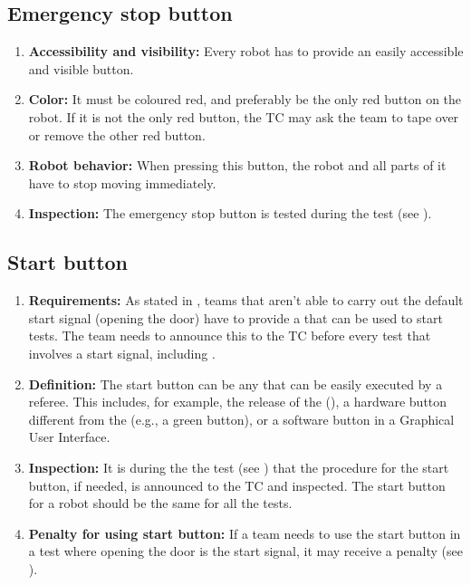 \subsection{Emergency stop button}
\label{rule:robots_emergency_button}

\begin{enumerate}
	\item \textbf{Accessibility and visibility:} Every robot has to provide an easily accessible and visible  button. 
	\item \textbf{Color:} It must be coloured red, and preferably be the only red button on the robot. If it is not the only red button, the TC may ask the team to tape over or remove the other red button. 
	\item \textbf{Robot behavior:} When pressing this button, the robot and all parts of it have to stop moving immediately.
	\item \textbf{Inspection:} The emergency stop button is tested during the  test (see ).
\end{enumerate}



\subsection{Start button}
\label{rule:start_button}

\begin{enumerate}
	\item \textbf{Requirements:} As stated in , teams that aren't able to carry out the default start signal (opening the door) have to provide a  that can be used to start tests. The team needs to announce this to the TC before every test that involves a start signal, including .
	\item \textbf{Definition:} The start button can be any  that can be easily executed by a referee.  This includes, for example, the release of the  (), a hardware button different from the  (e.g., a green button), or a software button in a Graphical User Interface. 
	\item \textbf{Inspection:} It is during the the  test (see ) that the procedure for the start button, if needed, is announced to the TC and inspected. The start button for a robot should be the same for all the tests.
	\item \textbf{Penalty for using start button:} If a team needs to use the start button in a test where opening the door is the start signal, it may receive a penalty (see ).
\end{enumerate}



